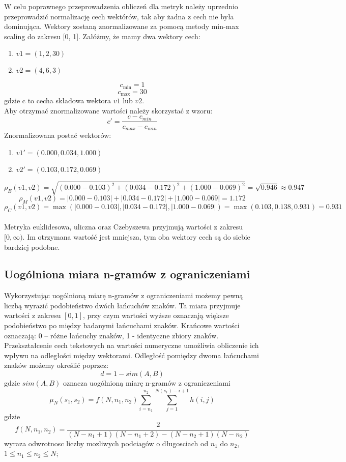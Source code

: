 \documentclass{article}
\begin{document}
W celu poprawnego przeprowadzenia obliczeń dla metryk należy uprzednio przeprowadzić normalizację cech wektórów, tak aby żadna z cech nie była dominująca. Wektory zostaną znormalizowane za pomocą metody min-max scaling do zakresu [0, 1]. Załóżmy, że mamy dwa wektory cech:
\begin{enumerate}
    \item \(v1 = (1, 2, 30)\)
    \item \(v2 = (4, 6, 3)\)
\end{enumerate}
\[
    c_{\min} = 1
\]
\[
    c_{\max} = 30
\]
gdzie c to cecha składowa wektora \(v1\) lub \(v2\). \\

Aby otrzymać znormalizowane wartości należy skorzystać z wzoru:
\begin{equation}
    c' = \frac{c - c_{min}}{c_{max} - c_{min}}
\end{equation}
Znormalizowana postać wektorów:
\begin{enumerate}
    \item \(v1' = (0.000, 0.034, 1.000)\)
    \item \(v2' = (0.103, 0.172, 0.069)\)
\end{enumerate} 
\[
     \rho_E(v1, v2) = \sqrt{(0.000 - 0.103)^2 + (0.034 - 0.172)^2 + (1.000 - 0.069)^2} = \sqrt{0.946} \approx 0.947
\]
\[
    \rho_M(v1, v2) = |0.000 - 0.103| + |0.034 - 0.172| + |1.000 - 0.069| = 1.172
\]
\[
    \rho_C(v1, v2) = \max(|0.000 - 0.103|, |0.034 - 0.172|, |1.000 - 0.069|) = \max(0.103, 0.138, 0.931) = 0.931
\]
\\
Metryka euklidesowa, uliczna oraz Czebyszewa przyjmują wartości z zakresu \([0, \infty)\). Im otrzymana wartość jest mniejsza, tym oba wektory cech są do siebie bardziej podobne.

\subsection{Uogólniona miara n-gramów z ograniczeniami}
Wykorzystując uogólnioną miarę n-gramów z ograniczeniami możemy pewną liczbą wyrazić podobieństwo dwóch łańcuchów znaków. Ta miara przyjmuje wartości z zakresu \([0,1]\), przy czym wartości wyższe oznaczają większe podobieństwo po między badanymi łańcuchami znaków. Krańcowe wartości oznaczają: 0 – różne łańcuchy znaków, 1 - identyczne zbiory znaków. Przekształcenie cech tekstowych na wartości numeryczne umożliwia obliczenie ich wpływu na odległości między wektorami. Odległość pomiędzy dwoma łańcuchami znaków możemy określić poprzez:
\begin{equation}
    d = 1 - sim(A, B)
\end{equation}
gdzie \(sim(A,B)\) oznacza uogólnioną miarę n-gramów z ograniczeniami
\begin{equation}
    \mu_N(s_1, s_2) = f(N, n_1, n_2) \sum_{i=n_1}^{n_2} \sum_{j=1}^{N(s_1) - i + 1} h(i, j)
\end{equation}
gdzie
\begin{equation} 
f(N, n_1, n_2) = \frac{2}{(N - n_1 + 1)(N - n_1 + 2) - (N - n_2 + 1)(N - n_2)}
\end{equation}
wyraza odwrotnosc liczby mozliwych podciagów o długosciach od \(n_1\) do \(n_2\),
\(1 \leq n_1 \leq n_2 \leq N\); \\
\end{document}
